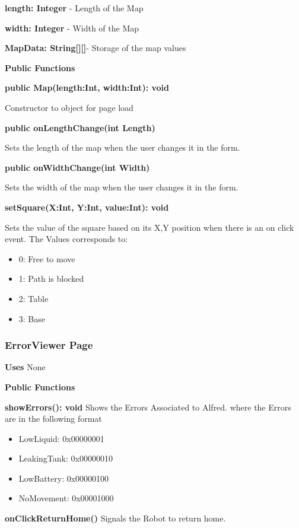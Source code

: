 \documentclass [10pt]{article}
\begin{document}
\textbf{length: Integer} - Length of the Map

\textbf{width: Integer} - Width of the Map

\textbf{MapData: String[][]}- Storage of the map values

\textbf{Public Functions}

\textbf{public Map(length:Int, width:Int): void}

Constructor to object for page load

\textbf{public onLengthChange(int Length)}

Sets the length of the map when the user changes it in the form.

\textbf{public onWidthChange(int Width)}

Sets the width of the map when the user changes it in the form.

\textbf{setSquare(X:Int, Y:Int, value:Int): void}

Sets the value of the square based on its X,Y position when there is an on click event. The Values corresponds to: 
 
\begin{itemize}
	\item 0: Free to move
	\item 1: Path is blocked
	\item 2: Table
	\item 3: Base
\end{itemize}


\subsubsection{ErrorViewer Page}
\textbf{Uses}
None

\textbf{Public Functions}

\textbf{ showErrors(): void}
Shows the Errors Associated to Alfred. where the Errors are in the following format
\begin{itemize}
	\item LowLiquid: 0x00000001
	\item LeakingTank: 0x00000010
	\item LowBattery: 0x00000100
	\item NoMovement: 0x00001000
\end{itemize}

\textbf{onClickReturnHome()}
Signals the Robot to return home.
\end{document}
